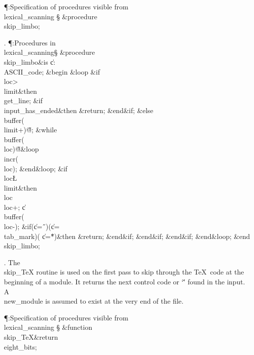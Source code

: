 \Y\P\?\4:Specification of procedures visible from \\{lexical\_scanning}\X%
\mathrel{+}\S\?\6
\&{procedure}\8\1\\{skip\_limbo}\2;\par
\fi

. \P\?:Procedures in \\{lexical\_scanning}\X\mathrel{+}\S\?\6
\&{procedure}\8\1\\{skip\_limbo}\2\8\&{is}\8\1\6
\|c\?:\?\\{ASCII\_code};\6
\4\&{begin}\6
\1\&{loop}\6
\&{if}\1\1\8\\{loc}\?>\?\\{limit}\2\8\&{then}\6
\\{get\_line};\6
\&{if}\1\1\8\\{input\_has\_ended}\2\8\&{then}\6
\&{return};\2\6
\&{end}\8\2\&{if}\1;\6
\4\&{else}\6
\\{buffer}\?\1(\?\\{limit}\?+\?\2)\K\?\H{@};\6
\1\&{while}\8\\{buffer}\?\1(\?\\{loc}\?\2)\I\?\H{@}\8\&{loop}\6
\\{incr}\?\1(\?\\{loc}\?\2)\?;\2\6
\&{end}\8\&{loop};\6
\&{if}\1\1\8\\{loc}\?\L\?\\{limit}\2\8\&{then}\6
\\{loc}\?\K\?\\{loc}\?+;\5
\|c\?\K\?\\{buffer}\?\1(\?\\{loc}\?-\?\2)\?;\6
\&{if}\1\1\?\8\1(\?\|c\?=\?\H{\ }\?\2)\V\1(\?\|c\?=\?\\{tab\_mark}\?\2)\V\1(\?%
\|c\?=\?\H{*}\?\2)\?\2\8\&{then}\6
\&{return};\2\6
\&{end}\8\2\&{if}\1;\2\6
\&{end}\8\2\&{if}\1;\2\6
\&{end}\8\2\&{if}\1;\2\6
\&{end}\8\&{loop};\2\6
\&{end}\8\\{skip\_limbo};\par
\fi

. The \\{skip\_TeX} routine is used on the first pass to skip through
the \TeX\ code at the beginning of a module. It returns the next
control code or `\v' found in the input. A \\{new\_module} is
assumed to exist at the very end of the file.

\Y\P\?\4:Specification of procedures visible from \\{lexical\_scanning}\X%
\mathrel{+}\S\?\6
\&{function}\8\1\\{skip\_TeX}\?\8\&{return}\?\8\\{eight\_bits}\2;\par
\fi

